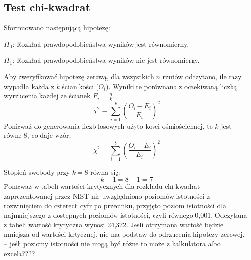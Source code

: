 \subsection{Test chi-kwadrat}
Sformuowano następującą hipotezę:
\par \begin{math} H_0 \end{math}: Rozkład prawdopodobieństwa wyników jest równomierny.
\par \begin{math} H_1 \end{math}: Rozkład prawdopodobieństwa wyników nie jest równomierny.
\par Aby zweryfikować hipotezę zerową, dla wszystkich \begin{math} n \end{math} rzutów odczytano, ile razy wypadła każda z 
\begin{math} k \end{math} ścian kości (\begin{math}O_i\end{math}). Wyniki te porównano z oczekiwaną
liczbą wyrzucenia każdej ze ścianek \begin{math}E_i = \frac{n}{k}\end{math}. 
\begin{displaymath}
    \chi^2 = \sum_{i=1}^{k} \left( \frac{O_i - E_i}{E_i} \right)^2
\end{displaymath}
Ponieważ do generowania liczb losowych użyto kości ośmiościennej, to \begin{math} k \end{math} jest równe 8, co daje wzór:
\begin{displaymath}
    \chi^2 = \sum^{8}_{i=1} \left( \frac{O_i - E_i}{E_i} \right)^2
\end{displaymath}
\par Stopień swobody przy \begin{math} k = 8 \end{math} równa się:
\begin{displaymath}
    k - 1 = 8 - 1 = 7
\end{displaymath}
Ponieważ w tabeli wartości krytycznych dla rozkładu chi-kwadrat zaprezentowanej przez NIST \cite{NIST2012} nie 
uwzględniono poziomów istotności z rozwinięciem do czterech cyfr po przecinku, przyjęto poziom istotności dla 
najmniejszego z dostępnych poziomów istotności, czyli równego 0{,}001. Odczytana z tabeli wartość krytyczna wynosi
24{,}322. Jeśli otrzymana wartość będzie mniejsza od wartości krtycznej, nie ma podstaw do odrzucenia 
hipotezy zerowej.
\\-- jeśli poziomy istotności nie mogą być różne to może z kalkulatora albo excela???? 


